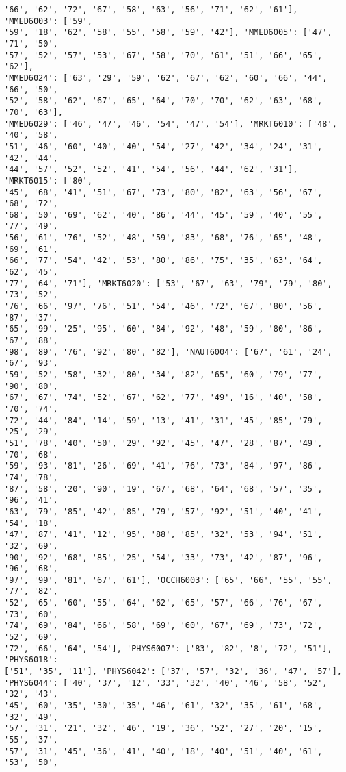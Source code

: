 \documentclass[11pt]{article}
\begin{document}
\begin{Verbatim}[commandchars=\\\{\}]
'66', '62', '72', '67', '58', '63', '56', '71', '62', '61'], 'MMED6003': ['59',
'59', '18', '62', '58', '55', '58', '59', '42'], 'MMED6005': ['47', '71', '50',
'57', '52', '57', '53', '67', '58', '70', '61', '51', '66', '65', '62'],
'MMED6024': ['63', '29', '59', '62', '67', '62', '60', '66', '44', '66', '50',
'52', '58', '62', '67', '65', '64', '70', '70', '62', '63', '68', '70', '63'],
'MMED6029': ['46', '47', '46', '54', '47', '54'], 'MRKT6010': ['48', '40', '58',
'51', '46', '60', '40', '40', '54', '27', '42', '34', '24', '31', '42', '44',
'44', '57', '52', '52', '41', '54', '56', '44', '62', '31'], 'MRKT6015': ['80',
'45', '68', '41', '51', '67', '73', '80', '82', '63', '56', '67', '68', '72',
'68', '50', '69', '62', '40', '86', '44', '45', '59', '40', '55', '77', '49',
'56', '61', '76', '52', '48', '59', '83', '68', '76', '65', '48', '69', '61',
'66', '77', '54', '42', '53', '80', '86', '75', '35', '63', '64', '62', '45',
'77', '64', '71'], 'MRKT6020': ['53', '67', '63', '79', '79', '80', '73', '52',
'76', '66', '97', '76', '51', '54', '46', '72', '67', '80', '56', '87', '37',
'65', '99', '25', '95', '60', '84', '92', '48', '59', '80', '86', '67', '88',
'98', '89', '76', '92', '80', '82'], 'NAUT6004': ['67', '61', '24', '67', '93',
'59', '52', '58', '32', '80', '34', '82', '65', '60', '79', '77', '90', '80',
'67', '67', '74', '52', '67', '62', '77', '49', '16', '40', '58', '70', '74',
'72', '44', '84', '14', '59', '13', '41', '31', '45', '85', '79', '25', '29',
'51', '78', '40', '50', '29', '92', '45', '47', '28', '87', '49', '70', '68',
'59', '93', '81', '26', '69', '41', '76', '73', '84', '97', '86', '74', '78',
'87', '58', '20', '90', '19', '67', '68', '64', '68', '57', '35', '96', '41',
'63', '79', '85', '42', '85', '79', '57', '92', '51', '40', '41', '54', '18',
'47', '87', '41', '12', '95', '88', '85', '32', '53', '94', '51', '32', '69',
'90', '92', '68', '85', '25', '54', '33', '73', '42', '87', '96', '96', '68',
'97', '99', '81', '67', '61'], 'OCCH6003': ['65', '66', '55', '55', '77', '82',
'52', '65', '60', '55', '64', '62', '65', '57', '66', '76', '67', '73', '60',
'74', '69', '84', '66', '58', '69', '60', '67', '69', '73', '72', '52', '69',
'72', '66', '64', '54'], 'PHYS6007': ['83', '82', '8', '72', '51'], 'PHYS6018':
['51', '35', '11'], 'PHYS6042': ['37', '57', '32', '36', '47', '57'],
'PHYS6044': ['40', '37', '12', '33', '32', '40', '46', '58', '52', '32', '43',
'45', '60', '35', '30', '35', '46', '61', '32', '35', '61', '68', '32', '49',
'57', '31', '21', '32', '46', '19', '36', '52', '27', '20', '15', '55', '37',
'57', '31', '45', '36', '41', '40', '18', '40', '51', '40', '61', '53', '50',

\end{Verbatim}
\end{document}
